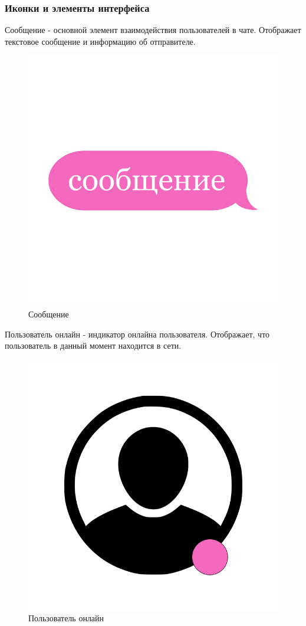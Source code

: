 \begin{enumerate}
\subsubsection{Иконки и элементы интерфейса}
Сообщение - основной элемент взаимодействия пользователей в чате. Отображает текстовое сообщение и информацию об отправителе.
\begin{figure}[H]
	\centering
	\includegraphics[width=0.7\linewidth]{images/message}
	\caption{Сообщение}
	\label{fig:message}
\end{figure}
Пользователь онлайн - индикатор онлайна пользователя. Отображает, что пользователь в данный момент находится в сети.
\begin{figure}[H]
	\centering
	\includegraphics[width=0.7\linewidth]{images/online}
	\caption{Пользователь онлайн}
	\label{fig:online}
\end{figure}

\end{enumerate}
